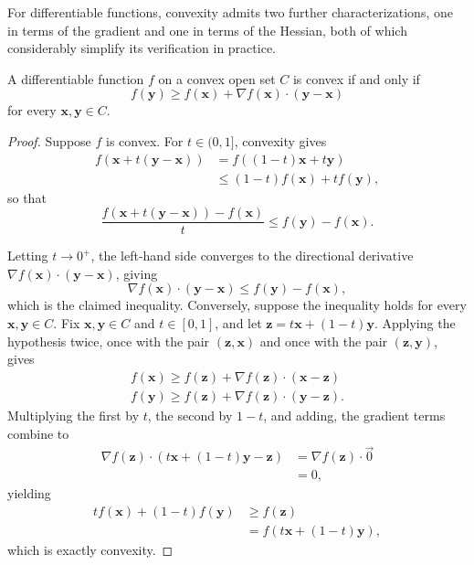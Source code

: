 For differentiable functions, convexity admits two further characterizations, one in terms of the gradient and one in terms of the Hessian, both of which considerably simplify its verification in practice.

\begin{theorem}
A differentiable function $f$ on a convex open set $C$ is convex if and only if
\[
f(\mathbf{y}) \geq f(\mathbf{x}) + \nabla f(\mathbf{x}) \cdot (\mathbf{y}-\mathbf{x})
\]
 for every $\mathbf{x}, \mathbf{y} \in C$.
\end{theorem}

\begin{proof}
Suppose $f$ is convex. For $t \in (0,1]$, convexity gives
\[
\begin{aligned}
f(\mathbf{x}+t(\mathbf{y}-\mathbf{x})) &= f((1-t)\mathbf{x}+t\mathbf{y}) \\
&\leq (1-t)f(\mathbf{x}) + tf(\mathbf{y}),
\end{aligned}
\]
so that
\[
\frac{f(\mathbf{x}+t(\mathbf{y}-\mathbf{x})) - f(\mathbf{x})}{t} \leq f(\mathbf{y}) - f(\mathbf{x}).
\]

Letting $t \to 0^+$, the left-hand side converges to the directional derivative $\nabla f(\mathbf{x}) \cdot (\mathbf{y}-\mathbf{x})$, giving
\[
\nabla f(\mathbf{x})\cdot(\mathbf{y}-\mathbf{x}) \leq f(\mathbf{y})-f(\mathbf{x}),
\] which is the claimed inequality. Conversely, suppose the inequality holds for every $\mathbf{x},\mathbf{y} \in C$. Fix $\mathbf{x}, \mathbf{y} \in C$ and $t \in [0,1]$, and let $\mathbf{z} = t\mathbf{x}+(1-t)\mathbf{y}$. Applying the hypothesis twice, once with the pair $(\mathbf{z},\mathbf{x})$ and once with the pair $(\mathbf{z},\mathbf{y})$, gives
\[
\begin{gathered}
f(\mathbf{x}) \geq f(\mathbf{z}) + \nabla f(\mathbf{z})\cdot(\mathbf{x}-\mathbf{z}) \\
f(\mathbf{y}) \geq f(\mathbf{z}) + \nabla f(\mathbf{z})\cdot(\mathbf{y}-\mathbf{z}).
\end{gathered}
\]
Multiplying the first by $t$, the second by $1-t$, and adding, the gradient terms combine to
\[
\begin{aligned}
\nabla f(\mathbf{z}) \cdot (t\mathbf{x}+(1-t)\mathbf{y} - \mathbf{z}) &= \nabla f(\mathbf{z}) \cdot \vec{0} \\
&= 0,
\end{aligned}
\]
yielding
\[
\begin{aligned}
tf(\mathbf{x}) + (1-t)f(\mathbf{y}) &\geq f(\mathbf{z}) \\
&= f(t\mathbf{x}+(1-t)\mathbf{y}),
\end{aligned}
\]
which is exactly convexity.
\end{proof}

